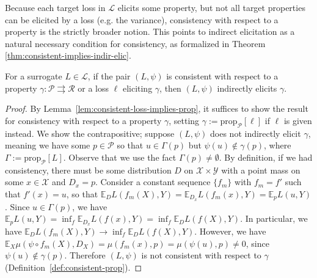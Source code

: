 \documentclass[anon,12pt]{colt2021} %
\newcommand{\Comments}{1}
\newcommand{\mynote}[2]{\ifnum\Comments=1\textcolor{#1}{#2}\fi}
\newcommand{\mytodo}[2]{\ifnum\Comments=1%
	\todo[linecolor=#1!80!black,backgroundcolor=#1,bordercolor=#1!80!black]{#2}\fi}
\newcommand{\raft}[1]{\mytodo{green!20!white}{RF: #1}}
\newcommand{\jessie}[1]{\mynote{purple}{[JF: #1]}}
\newcommand{\prop}[2][\mathcal{P}]{\mathrm{prop}_{#1}[#2]}
\newcommand{\propdis}{\mu}
\newcommand{\D}{\mathcal{D}}
\newcommand{\E}{\mathbb{E}}
\renewcommand{\L}{\mathcal{L}}
\newcommand{\R}{\mathcal{R}}
\renewcommand{\P}{\mathcal{P}}
\newcommand{\X}{\mathcal{X}}
\newcommand{\Y}{\mathcal{Y}}
\newcommand{\toto}{\rightrightarrows}
\begin{document}
Because each target loss in $\L$ elicits some property, but not all target properties can be elicited by a loss (e.g. the variance), consistency with respect to a property is the strictly broader notion.
This points to indirect elicitation as a natural necessary condition for consistency, as formalized in Theorem \ref{thm:consistent-implies-indir-elic}.


\begin{theorem}\label{thm:consistent-implies-indir-elic}
  For a surrogate $L \in \L$, if the pair $(L, \psi)$ is consistent with respect to a property $\gamma: \P \toto \R$ or a loss $\ell$ eliciting $\gamma$, then $(L, \psi)$ indirectly elicits $\gamma$.
\end{theorem}

\begin{proof}
  By Lemma~\ref{lem:consistent-loss-implies-prop}, it suffices to show the result for consistency with respect to a property $\gamma$, setting $\gamma := \prop{\ell}$ if $\ell$ is given instead.
  We show the contrapositive; suppose $(L, \psi)$ does not indirectly elicit $\gamma$, meaning we have some $p \in \P$ so that $u \in \Gamma(p)$ but $\psi(u) \not \in \gamma(p)$, where $\Gamma := \prop{L}$.
  Observe that we use the fact $\Gamma(p) \neq \emptyset$.
  By definition, if we had consistency, there must be some distribution $D$ on $\X\times\Y$ with a point mass on some $x\in\X$ and $D_x = p$.
  Consider a constant sequence $\{f_m\}$ with $f_m = f'$ such that $f'(x) = u$,
  so that $\E_D L(f_m(X), Y) = \E_{D_x} L(f_m(x),Y) = \E_p L(u,Y)$.
  Since $u \in \Gamma(p)$, we have $\E_p L(u,Y) = \inf_f \E_{D_x} L(f(x),Y) = \inf_f \E_D L(f(X),Y)$.
  In particular, we have $\E_D L(f_m(X), Y) \to \inf_f \E_D L(f(X),Y)$.
  However, we have $\E_X \propdis(\psi \circ f_m(X), D_X) = \propdis(f_m(x), p) = \propdis(\psi(u), p) \neq 0$, since $\psi(u) \not \in \gamma(p)$.
  Therefore $(L, \psi)$ is not consistent with respect to $\gamma$ (Definition~\ref{def:consistent-prop}).
\end{proof}
\end{document}
